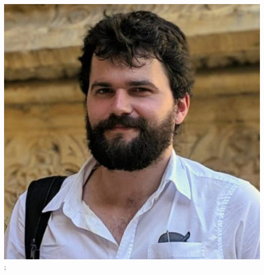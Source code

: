 \documentclass[aspectratio=169]{beamer}
\begin{document}
\begin{frame}
{        \includegraphics[width=0.10\textheight]{people/will_handley.jpg}%
    };
\end{frame}
\end{document}

